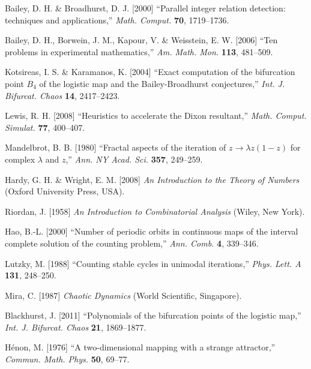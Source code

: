 \documentclass{ws-ijbc}
\begin{document}
\begin{thebibliography}{50}
  Bailey, D. H. \& Broadhurst, D. J. [2000]
  ``Parallel integer relation detection: techniques and applications,''
  {\it Math. Comput.}
  \textbf{70},
  1719--1736.

  Bailey, D. H., Borwein, J. M., Kapour, V. \& Weisstein, E. W. [2006]
  ``Ten problems in experimental mathematics,''
  {\it Am. Math. Mon.}
  \textbf{113},
  481--509.

  Kotsireas, I. S. \& Karamanos, K. [2004]
  ``Exact computation of the bifurcation point $B_4$ of the logistic map
  and  the Bailey-Broadhurst conjectures,''
  {\it Int. J. Bifurcat. Chaos}
  \textbf{14},
  2417--2423.

  Lewis, R. H. [2008]
  ``Heuristics to accelerate the Dixon resultant,''
  {\it Math. Comput. Simulat.}
  \textbf{77},
  400--407.

  Mandelbrot, B. B. [1980]
  ``Fractal aspects of the iteration of $z \rightarrow \lambda z(1-z)$
      for complex $\lambda$ and $z$,''
  {\it Ann. NY Acad. Sci.}
  \textbf{357},
  249--259.

  Hardy, G. H. \& Wright, E. M. [2008]
  {\it An Introduction to the Theory of Numbers}
  (Oxford University Press, USA).

  Riordan, J. [1958]
  {\it An Introduction to Combinatorial Analysis}
  (Wiley, New York).

  Hao, B.-L. [2000]
  ``Number of periodic orbits in continuous maps of
  the interval complete solution of the counting problem,''
  {\it Ann. Comb.}
  \textbf{4},
  339--346.

  Lutzky, M. [1988]
  ``Counting stable cycles in unimodal iterations,''
  {\it Phys. Lett. A}
  \textbf{131},
  248--250.

  Mira, C. [1987]
  {\it Chaotic Dynamics}
  (World Scientific, Singapore).

  Blackhurst, J. [2011]
  ``Polynomials of the bifurcation points of the logistic map,''
  {\it Int. J. Bifurcat. Chaos}
  \textbf{21},
  1869--1877.

  H\'enon, M. [1976]
  ``A two-dimensional mapping with a strange attractor,''
  {\it Commun. Math. Phys.}
  \textbf{50},
  69--77.


\end{thebibliography}
\end{document}
